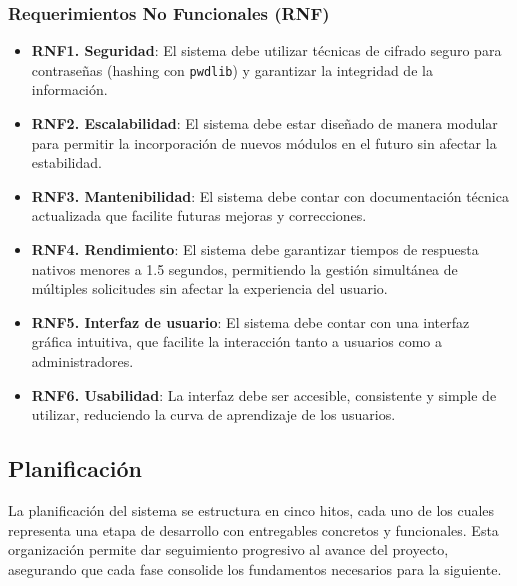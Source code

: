 \subsubsection*{Requerimientos No Funcionales (RNF)}
\begin{itemize}
	\item \textbf{RNF1. Seguridad}: El sistema debe utilizar técnicas de cifrado seguro para 
	contraseñas (hashing con \texttt{pwdlib}) y garantizar la integridad de la información.
	\item \textbf{RNF2. Escalabilidad}: El sistema debe estar diseñado de manera modular para 
	permitir la incorporación de nuevos módulos en el futuro sin afectar la estabilidad.
	\item \textbf{RNF3. Mantenibilidad}: El sistema debe contar con documentación técnica 
	actualizada que facilite futuras mejoras y correcciones.
	\item \textbf{RNF4. Rendimiento}: El sistema debe garantizar tiempos de respuesta nativos 
	menores a 1.5 segundos, permitiendo la gestión simultánea de múltiples solicitudes sin 
	afectar la experiencia del usuario.
	\item \textbf{RNF5. Interfaz de usuario}: El sistema debe contar con una interfaz gráfica 
	intuitiva, que facilite la interacción tanto a usuarios como a administradores.
	\item \textbf{RNF6. Usabilidad}: La interfaz debe ser accesible, consistente y simple de 
	utilizar, reduciendo la curva de aprendizaje de los usuarios.
\end{itemize}

\subsection{Planificación}

La planificación del sistema se estructura en cinco hitos, cada uno de los cuales representa 
una etapa de desarrollo con entregables concretos y funcionales. Esta organización permite 
dar seguimiento progresivo al avance del proyecto, asegurando que cada fase consolide los 
fundamentos necesarios para la siguiente.

